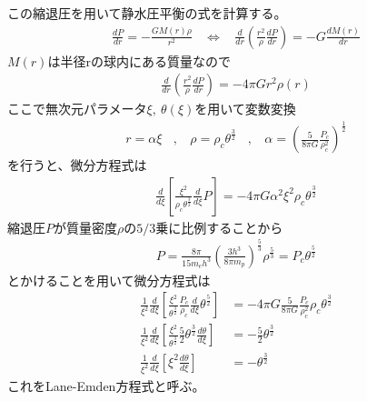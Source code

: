 この縮退圧を用いて静水圧平衡の式を計算する。
\begin{align*}
    \frac{dP}{dr}=-\frac{GM(r)\rho}{r^2}\ \ \ \ \Longleftrightarrow\ \ \ \ \frac{d}{dr}\left(\frac{r^2}{\rho}\frac{dP}{dr}\right)=-G\frac{dM(r)}{dr}
\end{align*}
$M(r)$は半径rの球内にある質量なので
\begin{align*}
    \frac{d}{dr}\left(\frac{r^2}{\rho}\frac{dP}{dr}\right)=-4\pi Gr^2\rho(r)
\end{align*}
ここで無次元パラメータ$\xi,\ \theta(\xi)$を用いて変数変換
\begin{align*}
    r=\alpha\xi\ \ \ \ ,\ \ \ \ \rho=\rho_c\theta^{\frac{3}{2}}\ \ \ \ ,\ \ \ \ \alpha=\left(\frac{5}{8\pi G}\frac{P_c}{\rho_c^2}\right)^{\frac{1}{2}}
\end{align*}
を行うと、微分方程式は
\begin{align*}
    \frac{d}{d\xi}\left[\frac{\xi^2}{\rho_c\theta^{\frac{3}{2}}}\frac{d}{d\xi}P\right]=-4\pi G\alpha^2\xi^2\rho_c\theta^{\frac{3}{2}}
\end{align*}
縮退圧$P$が質量密度$\rho$の$5/3$乗に比例することから
\begin{align*}
    P=\frac{8\pi}{15m_eh^3}\left(\frac{3h^3}{8\pi m_p}\right)^{\frac{5}{3}}\rho^{\frac{5}{3}}=P_c\theta^{\frac{5}{2}}
\end{align*}
とかけることを用いて微分方程式は
\begin{align*}
    \frac{1}{\xi^2}\frac{d}{d\xi}\left[\frac{\xi^2}{\theta^{\frac{3}{2}}}\frac{P_c}{\rho_c}\frac{d}{d\xi}\theta^{\frac{5}{2}}\right]&=-4\pi G\frac{5}{8\pi G}\frac{P_c}{\rho_c^2}\rho_c\theta^{\frac{3}{2}}\\
    \frac{1}{\xi^2}\frac{d}{d\xi}\left[\frac{\xi^2}{\theta^{\frac{3}{2}}}
    \frac{5}{2}\theta^{\frac{3}{2}}\frac{d\theta}{d\xi}\right]&=-\frac{5}{2}\theta^{\frac{3}{2}}\\
    \frac{1}{\xi^2}\frac{d}{d\xi}\left[\xi^2\frac{d\theta}{d\xi}\right]&=-\theta^{\frac{3}{2}}
\end{align*}
これをLane-Emden方程式と呼ぶ。

